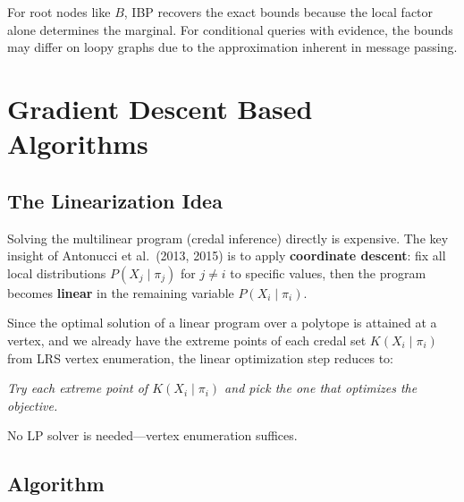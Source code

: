 \documentclass{article}
\begin{document}
For root nodes like $B$, IBP recovers the exact bounds because the local factor
alone determines the marginal. For conditional queries with evidence, the bounds
may differ on loopy graphs due to the approximation inherent in message passing.

\section{Gradient Descent Based Algorithms}
\subsection{The Linearization Idea}

Solving the multilinear program (credal inference) directly is expensive. The key insight
of Antonucci et al.\ (2013, 2015) is to apply \textbf{coordinate descent}: fix all local
distributions $P(X_j \mid \pi_j)$ for $j \neq i$ to specific values, then the program becomes
\textbf{linear} in the remaining variable $P(X_i \mid \pi_i)$.

Since the optimal solution of a linear program over a polytope is attained at a vertex,
and we already have the extreme points of each credal set $K(X_i \mid \pi_i)$ from LRS vertex
enumeration, the linear optimization step reduces to:

\begin{center}
\emph{Try each extreme point of $K(X_i \mid \pi_i)$ and pick the one that optimizes the objective.}
\end{center}

No LP solver is needed---vertex enumeration suffices.

\subsection{Algorithm}
\end{document}
